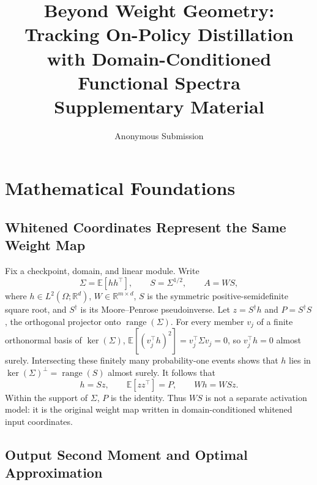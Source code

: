 \documentclass[letterpaper]{article} %
\title{Beyond Weight Geometry: Tracking On-Policy Distillation with Domain-Conditioned Functional Spectra\\Supplementary Material}
\author{Anonymous Submission}
\begin{document}
\maketitle
\appendix

\section{Mathematical Foundations}

\subsection{Whitened Coordinates Represent the Same Weight Map}

Fix a checkpoint, domain, and linear module. Write
\begin{equation}
\Sigma=\mathbb E[hh^\top],\qquad S=\Sigma^{1/2},\qquad A=WS,
\end{equation}
where $h\in L^2(\Omega;\mathbb R^d)$, $W\in\mathbb R^{m\times d}$, $S$ is the
symmetric positive-semidefinite square root, and $S^\dagger$ is its
Moore--Penrose pseudoinverse. Let $z=S^\dagger h$ and
$P=S^\dagger S$, the orthogonal projector onto $\operatorname{range}(\Sigma)$.
For every member $v_j$ of a finite orthonormal basis of $\ker(\Sigma)$,
$\mathbb E[(v_j^\top h)^2]=v_j^\top\Sigma v_j=0$, so $v_j^\top h=0$ almost
surely. Intersecting these finitely many probability-one events shows that $h$
lies in $\ker(\Sigma)^\perp=\operatorname{range}(S)$ almost surely. It follows that
\begin{equation}
h=Sz,\qquad \mathbb E[zz^\top]=P,\qquad Wh=WSz.
\label{eq:supp-whiten}
\end{equation}
Within the support of $\Sigma$, $P$ is the identity. Thus $WS$ is not a separate
activation model: it is the original weight map written in domain-conditioned whitened
input coordinates.

\subsection{Output Second Moment and Optimal Approximation}
\end{document}
